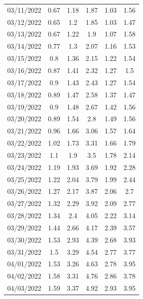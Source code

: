 \documentclass[withoutpreface,bwprint]{cumcmthesis} %
\begin{document}
\begin{appendices}
\begin{center}
\begin{longtable}{c|ccccc}
03/11/2022 & 0.67  & 1.18     & 1.87      & 1.03   & 1.56          \\
03/12/2022 & 0.65  & 1.2      & 1.85      & 1.03   & 1.47          \\
03/13/2022 & 0.67  & 1.22     & 1.9       & 1.07   & 1.58          \\
03/14/2022 & 0.77  & 1.3      & 2.07      & 1.16   & 1.53          \\
03/15/2022 & 0.8   & 1.36     & 2.15      & 1.22   & 1.54          \\
03/16/2022 & 0.87  & 1.41     & 2.32      & 1.27   & 1.5           \\
03/17/2022 & 0.9   & 1.43     & 2.43      & 1.27   & 1.54          \\
03/18/2022 & 0.89  & 1.47     & 2.58      & 1.37   & 1.47          \\
03/19/2022 & 0.9   & 1.48     & 2.67      & 1.42   & 1.56          \\
03/20/2022 & 0.89  & 1.54     & 2.8       & 1.49   & 1.56          \\
03/21/2022 & 0.96  & 1.66     & 3.06      & 1.57   & 1.64          \\
03/22/2022 & 1.02  & 1.73     & 3.31      & 1.66   & 1.79          \\
03/23/2022 & 1.1   & 1.9      & 3.5       & 1.78   & 2.14          \\
03/24/2022 & 1.19  & 1.93     & 3.69      & 1.92   & 2.28          \\
03/25/2022 & 1.22  & 2.04     & 3.79      & 1.99   & 2.44          \\
03/26/2022 & 1.27  & 2.17     & 3.87      & 2.06   & 2.7           \\
03/27/2022 & 1.32  & 2.29     & 3.92      & 2.09   & 2.77          \\
03/28/2022 & 1.34  & 2.4      & 4.05      & 2.22   & 3.14          \\
03/29/2022 & 1.44  & 2.66     & 4.17      & 2.39   & 3.57          \\
03/30/2022 & 1.53  & 2.93     & 4.39      & 2.68   & 3.93          \\
03/31/2022 & 1.5   & 3.29     & 4.54      & 2.77   & 3.77          \\
04/01/2022 & 1.53  & 3.26     & 4.63      & 2.78   & 3.95          \\
04/02/2022 & 1.58  & 3.31     & 4.76      & 2.86   & 3.78          \\
04/03/2022 & 1.59  & 3.37     & 4.92      & 2.93   & 3.95          \\

\end{longtable}
\end{center}
\end{appendices}
\end{document}
